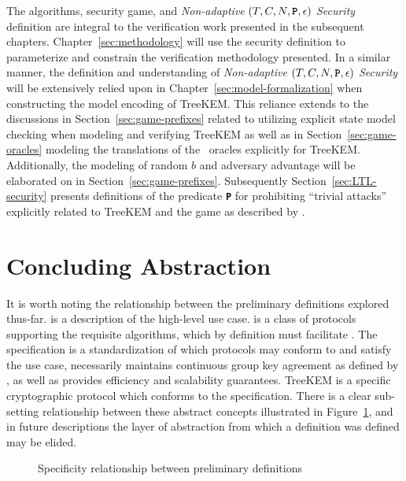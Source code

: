 The  algorithms, security game, and \emph{Non-adaptive} \((T, C, N, \textbf{\texttt{P}}, \epsilon)\) \emph{ Security} definition are integral to the verification work presented in the subsequent chapters.
Chapter\ \ref{sec:methodology} will use the security definition to parameterize and constrain the verification methodology presented.
In a similar manner, the definition and understanding of \emph{Non-adaptive} \((T, C, N, \textbf{\texttt{P}}, \epsilon)\) \emph{ Security} will be extensively relied upon in Chapter\ \ref{sec:model-formalization} when constructing the model encoding of TreeKEM.\@
This reliance extends to the discussions in Section\ \ref{sec:game-prefixes} related to utilizing explicit state model checking when modeling and verifying TreeKEM as well as in Section\ \ref{sec:game-oracles} modeling the translations of the \CGKAsec\ oracles explicitly for TreeKEM.\@
Additionally, the modeling of random \(b\) and adversary advantage will be elaborated on in Section\ \ref{sec:game-prefixes}.
Subsequently Section\ \ref{sec:LTL-security} presents definitions of the predicate \textbf{\texttt{P}} for prohibiting ``trivial attacks'' explicitly related to TreeKEM and the  game as described by \autocite{alwen2020security}.


\hypertarget{sec:concluding-abstraction}{%
\section{Concluding Abstraction}\label{sec:concluding-abstraction}}

It is worth noting the relationship between the preliminary definitions explored thus-far.
 is a description of the high-level use case.
 is a class of protocols supporting the requisite algorithms, which by definition must facilitate .
The  specification is a standardization of which protocols may conform to and satisfy the  use case, necessarily maintains continuous group key agreement as defined by , as well as provides efficiency and scalability guarantees.
TreeKEM is a specific cryptographic protocol which conforms to the  specification.
There is a clear sub-setting relationship between these abstract concepts illustrated in Figure\ \ref{fig:venn-protocols}, and in future descriptions the layer of abstraction from which a definition was defined may be elided.

\begin{figure}
\centering
\caption{\label{fig:venn-protocols}Specificity relationship between preliminary definitions}
\end{figure}

